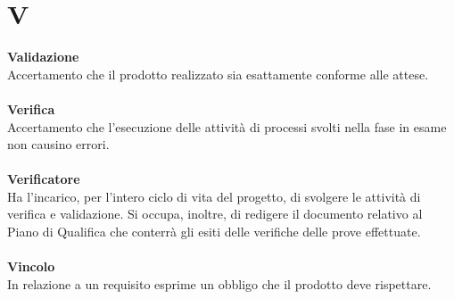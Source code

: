 \section{V}
\textbf{Validazione}\\
Accertamento che il prodotto realizzato sia esattamente conforme alle attese. \\ \\
\textbf{Verifica}\\
Accertamento che l'esecuzione delle attività di processi svolti nella fase in esame non causino errori. \\ \\
\textbf{Verificatore}\\
Ha l'incarico, per l'intero ciclo di vita del progetto, di svolgere le attività di verifica e validazione. Si occupa, inoltre, di redigere il documento relativo al Piano di Qualifica che conterrà gli esiti delle verifiche delle prove effettuate. \\ \\
\textbf{Vincolo}\\
In relazione a un requisito esprime un obbligo che il prodotto deve rispettare. \\ \\
\clearpage